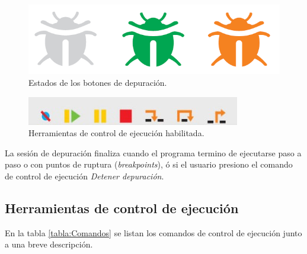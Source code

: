 \begin{figure}[h]
	\centering
	\includegraphics[scale=.50]{./Figures/estadosBotonDebug.PNG}
	\caption{Estados de los botones de depuración.}
	\label{fig:debug_view_habilitada}
\end{figure}


\begin{figure}[h]
	\centering
	\includegraphics[scale=.65]{./Figures/herramientas-control-ejecucion.PNG}
	\caption{Herramientas de control de ejecución habilitada.}
	\label{fig:herramientas-control-ejecucion}
\end{figure}


La sesión de depuración finaliza cuando el programa termino de ejecutarse paso a paso o con puntos de ruptura (\emph{breakpoints}), ó si el usuario presiono el comando de control de ejecución \emph{Detener depuración}. 

\subsection{Herramientas de control de ejecución}
\label{subsubsec:Iniciar/Herramientas de control de ejecución}

En la tabla \ref{tabla:Comandos} se listan los comandos de control de ejecución junto a una breve descripción.

